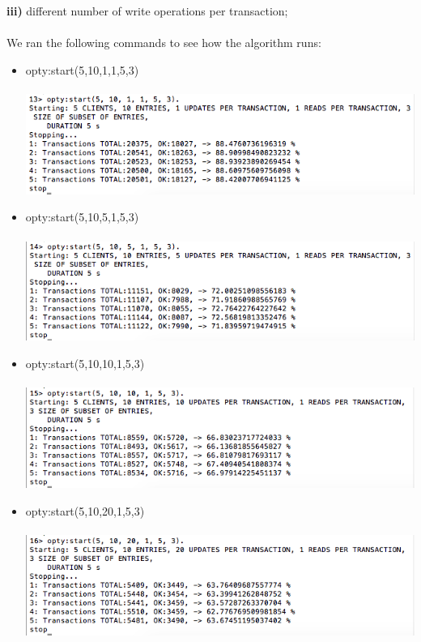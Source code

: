\documentclass[a4paper, 11pt]{article}
\begin{document}
%
\textbf{iii)} different number of write operations per transaction;\\\\
We ran the following commands to see how the algorithm runs:\\
\begin{itemize}
\item opty:start(5,10,1,1,5,3)\\\\
\includegraphics[scale=0.5]{images/exp-iii-1.png} \\
\item opty:start(5,10,5,1,5,3)\\\\
\includegraphics[scale=0.5]{images/exp-iii-2.png} \\
\item opty:start(5,10,10,1,5,3)\\\\
\includegraphics[scale=0.5]{images/exp-iii-3.png} \\
\item opty:start(5,10,20,1,5,3)\\\\
\includegraphics[scale=0.5]{images/exp-iii-4.png} \\

\end{itemize}
\end{document}
